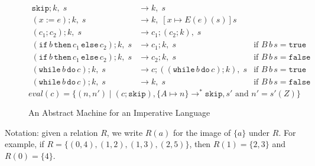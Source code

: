 \documentclass{tufte-handout}
\newcommand{\ASSIGN}[2]{#1 \mathrel{:=} #2}
\newcommand{\SEQ}[2]{#1 \mathrel{;} #2}
\newcommand{\SKIP}[0]{\mathtt{skip}}
\newcommand{\IF}[3]{\mathtt{if}\,#1\,\mathtt{then}\,#2\,\mathtt{else}\,#3}
\newcommand{\WHILE}[2]{\mathtt{while}\,#1\,\mathtt{do}\,#2}
\newcommand{\TRUE}[0]{\mathtt{true}}
\newcommand{\FALSE}[0]{\mathtt{false}}
\begin{document}
\begin{figure*}

\hfill {}
\begin{align*}
  \SEQ{\SKIP}{k},\; s & \longrightarrow k,\; s \\
  \SEQ{(\ASSIGN{x}{e})}{k},\; s & \longrightarrow k,\; [x\mapsto E(e)(s)]s\\
  \SEQ{(\SEQ{c_1}{c_2})}{k},\; s & \longrightarrow
      \SEQ{c_1}{(\SEQ{c_2}{k})},\; s \\
  \SEQ{(\IF{b}{c_1}{c_2})}{k},\; s & \longrightarrow \SEQ{c_1}{k},\; s
     & \text{if } B\,b\,s = \TRUE \\
  \SEQ{(\IF{b}{c_1}{c_2})}{k},\; s & \longrightarrow \SEQ{c_2}{k},\; s
     & \text{if } B\,b\,s = \FALSE \\
  \SEQ{(\WHILE{b}{c})}{k},\; s & \longrightarrow
      \SEQ{c}{(\SEQ{(\WHILE{b}{c})}{k})},\; s
    & \text{if } B\,b\,s = \TRUE \\
  \SEQ{(\WHILE{b}{c})}{k},\; s & \longrightarrow k,\; s
    & \text{if } B\,b\,s = \FALSE 
\end{align*}
\[
  \mathit{eval}(c) = \{ (n,n') \mid
     (\SEQ{c}{\SKIP}), \{A\mapsto n\}
     \longrightarrow^{*} \SKIP, s'
     \text{ and } n' = s'(Z) \}
\]
\caption{An Abstract Machine for an Imperative Language}
\label{fig:imp-impl}
\end{figure*}

Notation: given a relation $R$, we write $R(a)$ for the image of
$\{a\}$ under $R$. For example, if $R=\{ (0,4), (1,2), (1,3), (2,5)
\}$, then $R(1) = \{2,3\}$ and $R(0) = \{4\}$.
\end{document}
